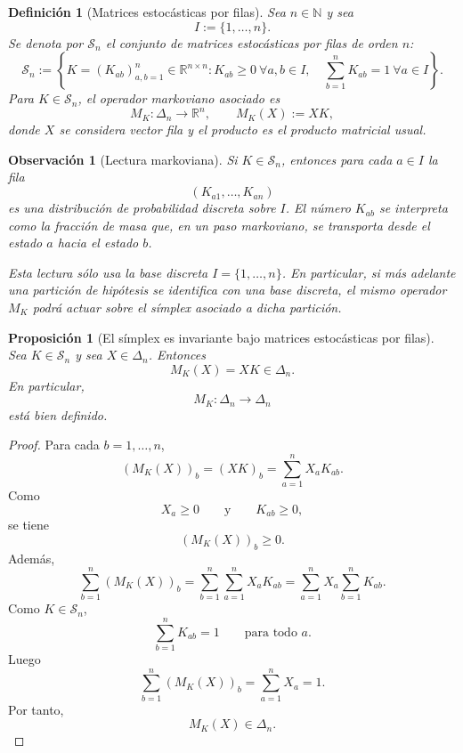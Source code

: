 ﻿\documentclass[12pt]{article}
\newtheorem{definicion}{Definición}[section]
\newtheorem{proposicion}{Proposición}[section]
\newtheorem{observacion}{Observación}[section]
\begin{document}
\begin{definicion}[Matrices estocásticas por filas]\label{def:Sn_markov}
Sea $n\in\mathbb N$ y sea
\[
I:=\{1,\dots,n\}.
\]
Se denota por $\mathcal S_n$ el conjunto de matrices estocásticas por filas de orden $n$:
\[
\mathcal S_n
:=
\left\{
K=(K_{ab})_{a,b=1}^n\in\mathbb R^{n\times n}
:
K_{ab}\ge 0\ \forall a,b\in I,
\quad
\sum_{b=1}^n K_{ab}=1\ \forall a\in I
\right\}.
\]
Para $K\in\mathcal S_n$, el operador markoviano asociado es
\[
M_K:\Delta_n\longrightarrow\mathbb R^n,
\qquad
M_K(X):=XK,
\]
donde $X$ se considera vector fila y el producto es el producto matricial usual.
\end{definicion}

\begin{observacion}[Lectura markoviana]
Si $K\in\mathcal S_n$, entonces para cada $a\in I$ la fila
\[
(K_{a1},\dots,K_{an})
\]
es una distribución de probabilidad discreta sobre $I$. El número $K_{ab}$ se interpreta como la fracción de masa que, en un paso markoviano, se transporta desde el estado $a$ hacia el estado $b$.

Esta lectura sólo usa la base discreta $I=\{1,\dots,n\}$. En particular, si más adelante una partición de hipótesis se identifica con una base discreta, el mismo operador $M_K$ podrá actuar sobre el símplex asociado a dicha partición.
\end{observacion}

\begin{proposicion}[El símplex es invariante bajo matrices estocásticas por filas]\label{prop:simplex_invariante_markov}
Sea $K\in\mathcal S_n$ y sea $X\in\Delta_n$. Entonces
\[
M_K(X)=XK\in\Delta_n.
\]
En particular,
\[
M_K:\Delta_n\longrightarrow\Delta_n
\]
está bien definido.
\end{proposicion}

\begin{proof}
Para cada $b=1,\dots,n$,
\[
(M_K(X))_b
=
(XK)_b
=
\sum_{a=1}^n X_aK_{ab}.
\]
Como
\[
X_a\ge 0
\qquad\text{y}\qquad
K_{ab}\ge 0,
\]
se tiene
\[
(M_K(X))_b\ge 0.
\]
Además,
\[
\sum_{b=1}^n(M_K(X))_b
=
\sum_{b=1}^n\sum_{a=1}^n X_aK_{ab}
=
\sum_{a=1}^n X_a\sum_{b=1}^n K_{ab}.
\]
Como $K\in\mathcal S_n$,
\[
\sum_{b=1}^n K_{ab}=1
\qquad\text{para todo }a.
\]
Luego
\[
\sum_{b=1}^n(M_K(X))_b
=
\sum_{a=1}^n X_a
=
1.
\]
Por tanto,
\[
M_K(X)\in\Delta_n.
\]
\end{proof}


\end{document}
